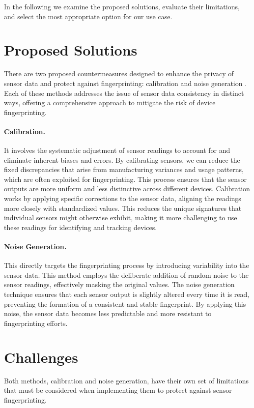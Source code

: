 \documentclass[11pt,
  oneside,openany,    %
]{scrreprt}
\begin{document}
In the following we examine the proposed solutions, evaluate their limitations, and select the most appropriate option for our use case.

\section{Proposed Solutions}
\label{sec:proposed}
There are two proposed countermeasures designed to enhance the privacy of sensor data and protect against fingerprinting: calibration and noise generation \cite{DBLP:conf/ndss/DasBC16}. 
Each of these methods addresses the issue of sensor data consistency in distinct ways, offering a comprehensive approach to mitigate the risk of device fingerprinting.

\paragraph{Calibration.}
\label{par:calibration}
It involves the systematic adjustment of sensor readings to account for and eliminate inherent biases and errors. 
By calibrating sensors, we can reduce the fixed discrepancies that arise from manufacturing variances and usage patterns, which are often exploited for fingerprinting. 
This process ensures that the sensor outputs are more uniform and less distinctive across different devices. 
Calibration works by applying specific corrections to the sensor data, aligning the readings more closely with standardized values. 
This reduces the unique signatures that individual sensors might otherwise exhibit, making it more challenging to use these readings for identifying and tracking devices.

\paragraph{Noise Generation.}
\label{par:noise}
This directly targets the fingerprinting process by introducing variability into the sensor data. 
This method employs the deliberate addition of random noise to the sensor readings, effectively masking the original values. 
The noise generation technique ensures that each sensor output is slightly altered every time it is read, preventing the formation of a consistent and stable fingerprint. 
By applying this noise, the sensor data becomes less predictable and more resistant to fingerprinting efforts.

\section{Challenges}
\label{sec:challenges}
Both methods, calibration and noise generation, have their own set of limitations that must be considered when implementing them to protect against sensor fingerprinting.
\end{document}
